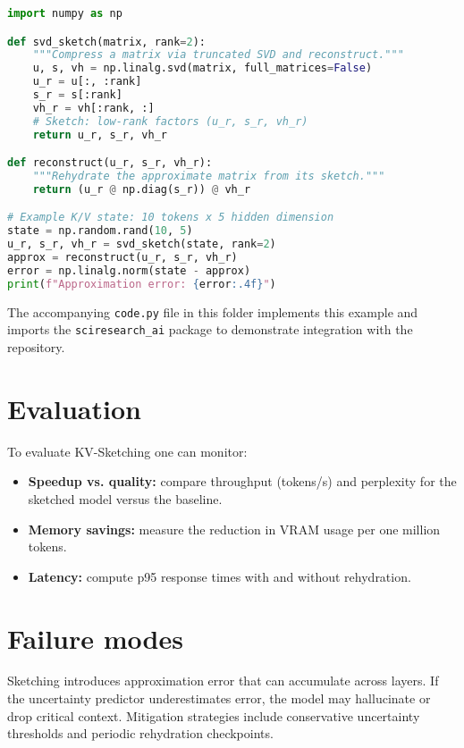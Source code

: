 \documentclass{article}
\begin{document}
\begin{lstlisting}[language=Python, caption={Simple KV-sketching
prototype using SVD.}, label={alg:kvsketch}]
import numpy as np

def svd_sketch(matrix, rank=2):
    """Compress a matrix via truncated SVD and reconstruct."""
    u, s, vh = np.linalg.svd(matrix, full_matrices=False)
    u_r = u[:, :rank]
    s_r = s[:rank]
    vh_r = vh[:rank, :]
    # Sketch: low-rank factors (u_r, s_r, vh_r)
    return u_r, s_r, vh_r

def reconstruct(u_r, s_r, vh_r):
    """Rehydrate the approximate matrix from its sketch."""
    return (u_r @ np.diag(s_r)) @ vh_r

# Example K/V state: 10 tokens x 5 hidden dimension
state = np.random.rand(10, 5)
u_r, s_r, vh_r = svd_sketch(state, rank=2)
approx = reconstruct(u_r, s_r, vh_r)
error = np.linalg.norm(state - approx)
print(f"Approximation error: {error:.4f}")
\end{lstlisting}

The accompanying \texttt{code.py} file in this folder implements
this example and imports the \texttt{sciresearch\_ai} package to
demonstrate integration with the repository.

\section{Evaluation}
To evaluate KV-Sketching one can monitor:
\begin{itemize}
  \item \textbf{Speedup vs. quality:} compare throughput (tokens/s) and
        perplexity for the sketched model versus the baseline.
  \item \textbf{Memory savings:} measure the reduction in VRAM usage
        per one million tokens.
  \item \textbf{Latency:} compute p95 response times with and without
        rehydration.
\end{itemize}

\section{Failure modes}
Sketching introduces approximation error that can accumulate across
layers.  If the uncertainty predictor underestimates error, the model
may hallucinate or drop critical context.  Mitigation strategies
include conservative uncertainty thresholds and periodic rehydration
checkpoints.
\end{document}
